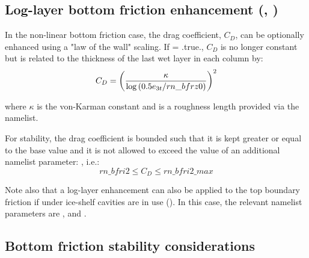 \documentclass[../main/NEMO_manual]{subfiles}
\begin{document}
\subsection[Log-layer btm frict enhncmnt (\protect\np{nn\_botfr}\forcode{ = 2}, \protect\np{ln\_loglayer}\forcode{ = .true.})]
				{Log-layer bottom friction enhancement (\protect{}, \protect{})}
\label{subsec:ZDF_bfr_loglayer}

In the non-linear bottom friction case, the drag coefficient, $C_D$, can be optionally enhanced using
a "law of the wall" scaling.
If   = .true., $C_D$ is no longer constant but is related to the thickness of
the last wet layer in each column by:
\[
  C_D = \left ( {\kappa \over {\rm log}\left ( 0.5e_{3t}/rn\_bfrz0 \right ) } \right )^2
\]

\noindent where $\kappa$ is the von-Karman constant and  is a roughness length provided via
the namelist.

For stability, the drag coefficient is bounded such that it is kept greater or equal to
the base  value and it is not allowed to exceed the value of an additional namelist parameter:
, i.e.:
\[
  rn\_bfri2 \leq C_D \leq rn\_bfri2\_max
\]

\noindent Note also that a log-layer enhancement can also be applied to the top boundary friction if
under ice-shelf cavities are in use ().
In this case, the relevant namelist parameters are ,  and .

\subsection{Bottom friction stability considerations}
\label{subsec:ZDF_bfr_stability}
\end{document}
